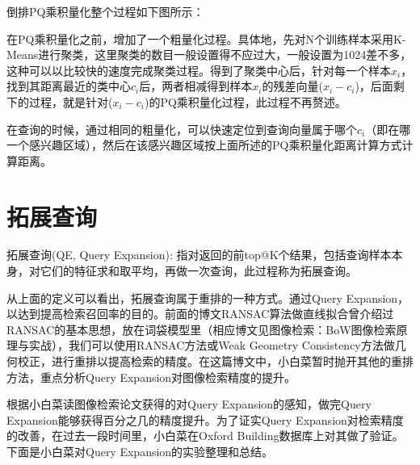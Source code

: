 \documentclass[color=cyan,mathpazo,titlestyle=hang]{elegantbook}
\begin{document}
倒排PQ乘积量化整个过程如下图所示：

在PQ乘积量化之前，增加了一个粗量化过程。具体地，先对N个训练样本采用K-Means进行聚类，这里聚类的数目一般设置得不应过大，一般设置为1024差不多，这种可以以比较快的速度完成聚类过程。得到了聚类中心后，针对每一个样本$x_i$，找到其距离最近的类中心$c_i$后，两者相减得到样本$x_i$的残差向量($x_i-c_i$)，后面剩下的过程，就是针对($x_i-c_i$)的PQ乘积量化过程，此过程不再赘述。

在查询的时候，通过相同的粗量化，可以快速定位到查询向量属于哪个$c_i$（即在哪一个感兴趣区域），然后在该感兴趣区域按上面所述的PQ乘积量化距离计算方式计算距离。

\section{拓展查询}

拓展查询(QE, Query Expansion): 指对返回的前top@K个结果，包括查询样本本身，对它们的特征求和取平均，再做一次查询，此过程称为拓展查询。

从上面的定义可以看出，拓展查询属于重排的一种方式。通过Query Expansion，以达到提高检索召回率的目的。前面的博文RANSAC算法做直线拟合曾介绍过RANSAC的基本思想，放在词袋模型里（相应博文见图像检索：BoW图像检索原理与实战），我们可以使用RANSAC方法或Weak Geometry Consistency方法做几何校正，进行重排以提高检索的精度。在这篇博文中，小白菜暂时抛开其他的重排方法，重点分析Query Expansion对图像检索精度的提升。

根据小白菜读图像检索论文获得的对Query Expansion的感知，做完Query Expansion能够获得百分之几的精度提升。为了证实Query Expansion对检索精度的改善，在过去一段时间里，小白菜在Oxford Building数据库上对其做了验证。下面是小白菜对Query Expansion的实验整理和总结。



\end{document}
